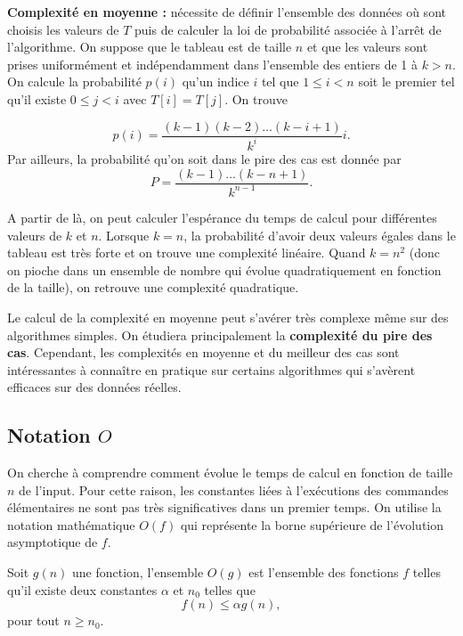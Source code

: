 \documentclass{../cours}
\begin{document}
\begin{Example}
\textbf{Complexité en moyenne :} nécessite de définir l'ensemble des données où sont choisis les valeurs de $T$ puis de calculer la loi de probabilité associée à l'arrêt de l'algorithme. On suppose que le tableau est de taille $n$ et que les valeurs sont prises uniformément et indépendamment dans l'ensemble des entiers de 1 à $k > n$. On calcule la probabilité $p(i)$ qu'un indice $i$ tel que $1 \leq i < n$ soit le premier tel qu'il existe $0 \leq j < i$ avec $T[i] = T[j]$. On trouve

\begin{equation}
p(i) = \frac{(k-1)(k-2)\dots (k-i+1)}{k^{i}}i.
\end{equation}
Par ailleurs, la probabilité qu'on soit dans le pire des cas est donnée par
\begin{equation}
P = \frac{(k-1)\dots(k-n+1)}{k^{n-1}}.
\end{equation}

A partir de là, on peut calculer l'espérance du temps de calcul pour différentes valeurs de $k$ et $n$. Lorsque $k=n$, la probabilité d'avoir deux valeurs égales dans le tableau est très forte et on trouve une complexité linéaire. Quand $k=n^2$ (donc on pioche dans un ensemble de nombre qui évolue quadratiquement en fonction de la taille), on retrouve une complexité quadratique.

\end{Example}

Le calcul de la complexité en moyenne peut s'avérer très complexe même sur des algorithmes simples. On étudiera principalement la \textbf{complexité du pire des cas}. Cependant, les complexités en moyenne et du meilleur des cas sont intéressantes à connaître en pratique sur certains algorithmes qui s'avèrent efficaces sur des données réelles. 

\subsection{Notation $O$}

On cherche à comprendre comment évolue le temps de calcul en fonction de taille $n$ de l'input. Pour cette raison, les constantes liées à l'exécutions des commandes élémentaires ne sont pas très significatives dans un premier temps. On utilise la notation mathématique $O(f)$ qui représente la borne supérieure de l'évolution asymptotique de $f$.

\begin{Definition}
Soit $g(n)$ une fonction, l'ensemble $O(g)$ est l'ensemble des fonctions $f$ telles qu'il existe deux constantes $\alpha$ et $n_0$ telles que
\begin{equation}
f(n) \leq \alpha g(n),
\end{equation}
pour tout  $n \geq n_0$.
\end{Definition}
\end{document}
